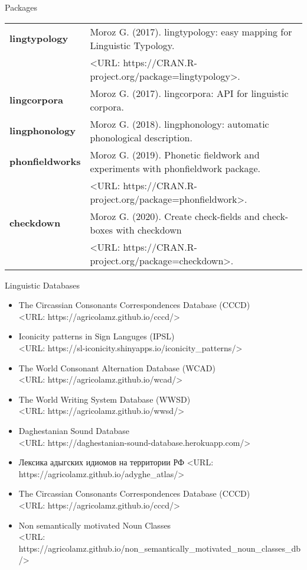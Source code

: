 \documentclass{resume} %
\begin{document}
\begin{rSection}{Packages}
\begin{tabular}{ @{} >{\bfseries}l @{\hspace{6ex}} l }
lingtypology  & Moroz G. (2017). lingtypology: easy mapping for Linguistic Typology. \\
& <URL: https://CRAN.R-project.org/package=lingtypology>.\\
lingcorpora & Moroz G. (2017). lingcorpora: API for linguistic corpora.\\
lingphonology & Moroz G. (2018). lingphonology: automatic phonological description. \\
phonfieldworks & Moroz G. (2019). Phonetic fieldwork and experiments with phonfieldwork
package.\\
& <URL: https://CRAN.R-project.org/package=phonfieldwork>.\\
checkdown & Moroz G. (2020). Create check-fields and check-boxes with checkdown\\
& <URL: https://CRAN.R-project.org/package=checkdown>.\\
\end{tabular}

\end{rSection}

\begin{rSection}{Linguistic Databases}
\begin{itemize}
\item The Circassian Consonants Correspondences Database (CCCD) \\ <URL: https://agricolamz.github.io/cccd/> 
\item Iconicity patterns in Sign Languges (IPSL) \\ <URL: https://sl-iconicity.shinyapps.io/iconicity\_patterns/>
\item The World Consonant Alternation Database (WCAD) \\ <URL: https://agricolamz.github.io/wcad/>
\item The World Writing System Database (WWSD) \\ <URL: https://agricolamz.github.io/wwsd/>
\item Daghestanian Sound Database \\ <URL: https://daghestanian-sound-database.herokuapp.com/>
\item Лексика адыгских идиомов на территории РФ <URL: https://agricolamz.github.io/adyghe\_atlas/>
\item The Circassian Consonants Correspondences Database (CCCD) \\ <URL: https://agricolamz.github.io/cccd/>
\item Non semantically motivated Noun Classes \\ <URL: https://agricolamz.github.io/non\_semantically\_motivated\_noun\_classes\_db/> \vspace{0.6cm}
\end{itemize}
\end{rSection}
\end{document}
